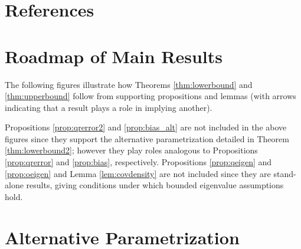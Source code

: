 \documentclass[11pt,twoside]{article}
\theoremstyle{definition}
\theoremstyle{remark}
\begin{document}
\section*{References}
\vspace{-1cm}




\pagebreak

\appendix

\appendixpage

\section*{Roadmap of Main Results}

The following figures illustrate how Theorems \ref{thm:lowerbound} and \ref{thm:upperbound} follow from supporting propositions and lemmas (with arrows indicating that a result plays a role in implying another). \\


\begin{figure}[h!]
\begin{figure}[omitted: a diagram of this paper's results, not reproduced here]\end{figure}
\end{figure}

\bigskip

\begin{figure}[h!]
\begin{figure}[omitted: a diagram of this paper's results, not reproduced here]\end{figure}
\end{figure}

\bigskip

Propositions \ref{prop:qrerror2} and \ref{prop:bias_alt} are not included in the above figures since they support the alternative parametrization detailed in Theorem \ref{thm:lowerbound2}; however they play  roles analogous to Propositions \ref{prop:qrerror} and \ref{prop:bias}, respectively. Propositions \ref{prop:qeigen} and \ref{prop:oeigen} and Lemma \ref{lem:covdensity} are not included since they are stand-alone results, giving conditions under which  bounded eigenvalue assumptions hold. \\


\section{Alternative Parametrization}
\label{sec:model2}
\end{document}
